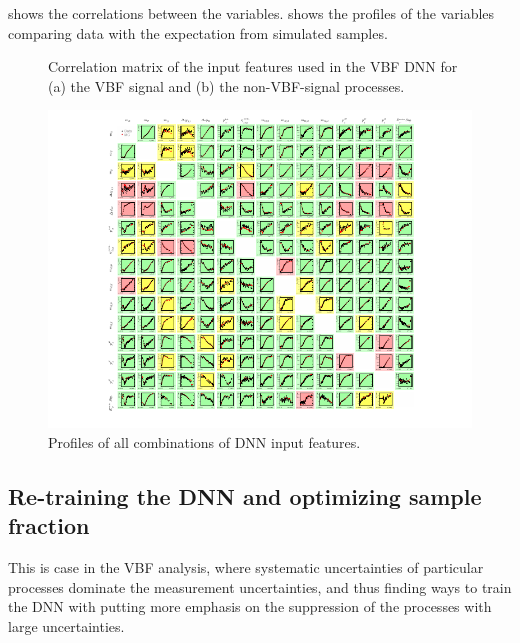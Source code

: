  shows the correlations between the variables.
 shows the profiles of the variables comparing data with the expectation from simulated samples.

\begin{figure}[t]
    \caption{Correlation matrix of the input features used in the VBF DNN for (a) the VBF signal and (b) the non-VBF-signal processes.}
    \label{fig:dnn-features-correlations}
\end{figure}


\begin{figure}[t]
    \includegraphics[width=\textwidth,trim=45 0 45 0]{figures/hww/dnn/correlations_PROF_SR.pdf}
    \caption{Profiles of all combinations of DNN input features.}
    \label{fig:dnn-features-profiles}
\end{figure}

\subsection{Re-training the DNN and optimizing sample fraction}
\label{subsec:sample-fraction-optimization}
This is case in the VBF analysis, where systematic uncertainties of particular processes dominate the measurement uncertainties, and thus finding ways to train the DNN with putting more emphasis on the suppression of the processes with large uncertainties. 

